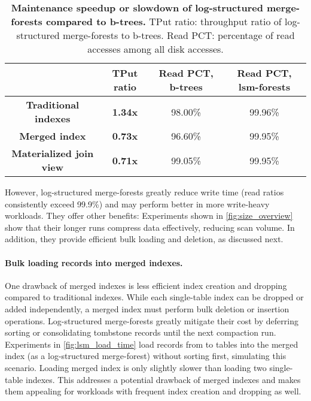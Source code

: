 \documentclass[biblatex, english]{lni}
\begin{document}
\begin{table}[htb]
    \centering
    \caption{\textbf{Maintenance speedup or slowdown of log-structured merge-forests compared to b-trees.}
        TPut ratio: throughput ratio of log-structured merge-forests to b-trees.
        Read PCT: percentage of read accesses among all disk accesses.}\label{tab:lsm_speedup}
    \begin{tabular}{c || c || c c}
    \hline
    & \textbf{TPut ratio} & \textbf{Read PCT, b-trees} & \textbf{Read PCT, lsm-forests}\\
    \hline
    \textbf{Traditional indexes} & \textbf{1.34x} & 98.00\% & 99.96\%\\
    \textbf{Merged index} & \textbf{0.73x} & 96.60\% & 99.95\%\\
    \textbf{Materialized join view} & \textbf{0.71x} & 99.05\% & 99.95\%\\
    \hline
    \end{tabular}
\end{table}

\noindent However, log-structured merge-forests greatly reduce write time (read ratios consistently exceed 99.9\%) and may perform better in more write-heavy workloads.
They offer other benefits:
Experiments shown in \cref{fig:size_overview} show that their longer runs compress data effectively, reducing scan volume.
In addition, they provide efficient bulk loading and deletion, as discussed next.

\paragraph{Bulk loading records into merged indexes.}

One drawback of merged indexes is less efficient index creation and dropping compared to traditional indexes.
While each single-table index can be dropped or added independently, a merged index must perform bulk deletion or insertion operations.
Log-structured merge-forests greatly mitigate their cost by deferring sorting or consolidating tombstone records until the next compaction run.
Experiments in \cref{fig:lsm_load_time} load records from to tables into the merged index (as a log-structured merge-forest) without sorting first, simulating this scenario.
Loading merged index is only slightly slower than loading two single-table indexes.
This addresses a potential drawback of merged indexes and makes them appealing for workloads with frequent index creation and dropping as well.
\end{document}
